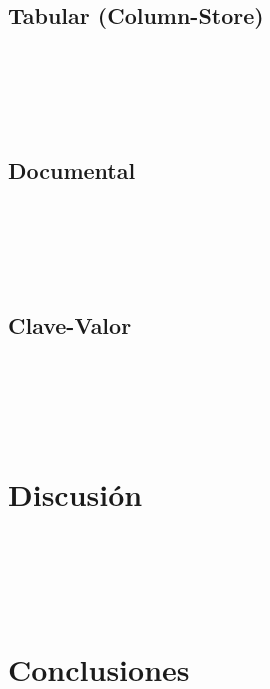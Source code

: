 \documentclass[twoside,onecolumn]{article}
\begin{document}
\begin{flushright}
\begin{itemize}
\subsection{ Tabular (Column-Store)}

\textbf{}\\
\textbf{}\\
\textbf{}\\
\textbf{}\\



\subsection{Documental}
\textbf{}\\
\textbf{}\\
\textbf{}\\
\textbf{}\\




\subsection{Clave-Valor }
\textbf{}\\
\textbf{}\\
\textbf{}\\
\textbf{}\\






\section{Discusión}
\textbf{}\\
\textbf{}\\
\textbf{}\\
\textbf{}\\




\section{Conclusiones}
\textbf{}\\
\textbf{}\\
\textbf{}\\
\textbf{}\\




\textbf{}\\
\textbf{}\\


\end{itemize}
\end{flushright}
\end{document}
